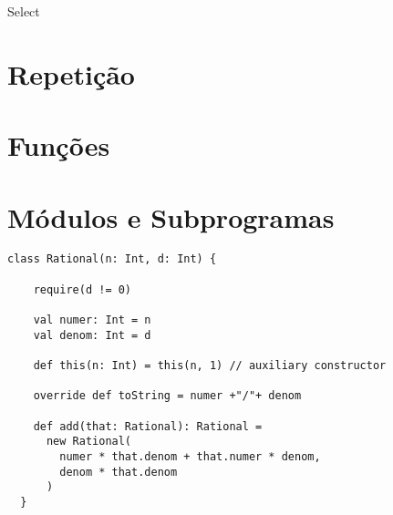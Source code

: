 Select

\section{Repeti\c{c}\~{a}o}

\section{Fun\c{c}\~{o}es}



\section{M\'{o}dulos e Subprogramas}


\begin{lstlisting}
class Rational(n: Int, d: Int) {

    require(d != 0)

    val numer: Int = n
    val denom: Int = d

    def this(n: Int) = this(n, 1) // auxiliary constructor

    override def toString = numer +"/"+ denom

    def add(that: Rational): Rational =
      new Rational(
        numer * that.denom + that.numer * denom,
        denom * that.denom
      )
  }
    \end{lstlisting}


